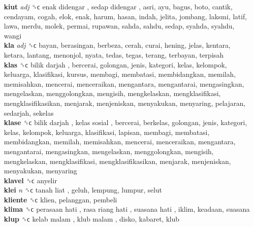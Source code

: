 \textbf{kiut} \emph{adj}  ␝ϲ   enak didengar ,  sedap didengar , asri, ayu, bagus, boto, cantik, cendayam, cogah, elok, enak, harum, hasan, indah, jelita, jombang, laksmi, latif, lawa, merdu, molek, permai, rupawan, sahda, sahdu, sedap, syahda, syahdu, wangi  \\
\textbf{kla} \emph{adj}  ␝ϲ  bayan, berasingan, berbeza, cerah, curai, hening, jelas, kentara, ketara, lantang, menonjol, nyata, tedas, tegas, terang, terbayan, terpisah  \\
\textbf{klas} ␝ϲ   bilik darjah , bercerai, golongan, jenis, kategori, kelas, kelompok, keluarga, klasifikasi, kursus, membagi, membatasi, membidangkan, memilah, memisahkan, mencerai, menceraikan, mengantara, mengantarai, mengasingkan, mengelaskan, menggolongkan, mengisih, mengkelaskan, mengklasifikasi, mengklasifikasikan, menjarak, menjeniskan, menyakukan, menyaring, pelajaran, sedarjah, sekelas  \\
\textbf{klase} ␝ϲ   bilik darjah ,  kelas sosial , bercerai, berkelas, golongan, jenis, kategori, kelas, kelompok, keluarga, klasifikasi, lapisan, membagi, membatasi, membidangkan, memilah, memisahkan, mencerai, menceraikan, mengantara, mengantarai, mengasingkan, mengelaskan, menggolongkan, mengisih, mengkelaskan, mengklasifikasi, mengklasifikasikan, menjarak, menjeniskan, menyakukan, menyaring  \\
\textbf{klavel} ␝ϲ  anyelir  \\
\textbf{klei} \emph{n}  ␝ϲ   tanah liat , geluh, lempung, lumpur, selut  \\
\textbf{kliente} ␝ϲ  klien, pelanggan, pembeli  \\
\textbf{klima} ␝ϲ   perasaan hati ,  rasa riang hati ,  suasana hati , iklim, keadaan, suasana  \\
\textbf{klup} ␝ϲ   kelab malam ,  klub malam , disko, kabaret, klub  \\
